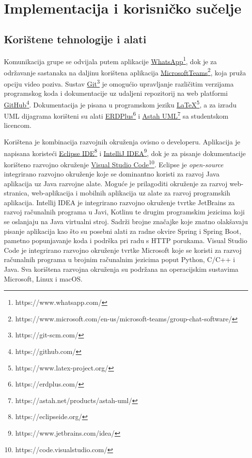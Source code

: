\chapter{Implementacija i korisničko sučelje}
		
		
		\section{Korištene tehnologije i alati}
		
			\indent \indent Komunikacija grupe se odvijala putem aplikacije \href{https://www.whatsapp.com/}{WhatsApp\footnote{https://www.whatsapp.com/}}, dok je za održavanje sastanaka na daljinu korištena aplikacija \href{https://www.microsoft.com/en-us/microsoft-teams/group-chat-software/}{MicrosoftTeams\footnote{https://www.microsoft.com/en-us/microsoft-teams/group-chat-software/}}, koja pruža opciju video poziva. Sustav \href{https://git-scm.com/}{Git\footnote{https://git-scm.com/}} je omogućio upravljanje različitim verzijama programskog koda i dokumentacije uz udaljeni repozitorij na web platformi \href{https://github.com/}{GitHub\footnote{https://github.com/}}. Dokumentacija je pisana u programskom jeziku \href{https://www.latex-project.org/}{LaTeX\footnote{https://www.latex-project.org/}}, a za izradu UML dijagrama korišteni su alati \href{https://erdplus.com/}{ERDPlus\footnote{https://erdplus.com/}} i \href{https://astah.net/products/astah-uml/}{Astah UML\footnote{https://astah.net/products/astah-uml/}} sa studentskom licencom.
				
			\indent Korištena je kombinacija razvojnih okruženja ovisno o developeru. Aplikacija je napisana koristeći \href{https://eclipseide.org/}{Eclipse IDE\footnote{https://eclipseide.org/}} i \href{https://www.jetbrains.com/idea/}{IntelliJ IDEA\footnote{https://www.jetbrains.com/idea/}}, dok je za pisanje dokumentacije korišteno razvojno okruženje \href{https://code.visualstudio.com/}{Visual Studio Code\footnote{https://code.visualstudio.com/}}. Eclipse je \textit{open-source} integrirano razvojno okruženje koje se dominantno koristi za razvoj Java aplikacija uz Java razvojne alate. Moguće je prilagoditi okruženje za razvoj web-stranica, web-aplikacija i mobilnih aplikacija uz alate za razvoj programskih aplikacija. Intellij IDEA je integrirano razvojno okruženje tvrtke JetBrains za razvoj računalnih programa u Javi, Kotlinu te drugim programskim jezicima koji se oslanjaju na Java virtualni stroj. Sadrži brojne značajke koje znatno olakšavaju pisanje aplikacija kao što su posebni alati za radne okvire Spring i Spring Boot, pametno popunjavanje koda i podrška pri radu s HTTP porukama. Visual Studio Code je integrirano razvojno okruženje tvrtke Microsoft koje se koristi za razvoj računalnih programa u brojnim računalnim jezicima poput Python, C/C++ i Java. Sva korištena razvojna okruženja su podržana na operacijskim sustavima Microsoft, Linux i macOS. \\
				
